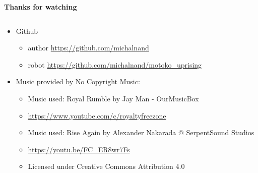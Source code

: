 \documentclass[xcolor=dvipsnames]{beamer}
\begin{document}
\begin{frame}{\bf Thanks for watching}
\begin{columns}
\begin{column}{0.7\textwidth}  %
{\small
    \begin{itemize}
        \item Github
            \begin{itemize}
                \item author \url{https://github.com/michalnand}
                \item robot \url{https://github.com/michalnand/motoko_uprising}
            \end{itemize}
        \item Music provided by No Copyright Music:
            \begin{itemize}
                \item Music used: Royal Rumble by Jay Man - OurMusicBox
                \item \url{https://www.youtube.com/c/royaltyfreezone}
                \item Music used: Rise Again by Alexander Nakarada @ SerpentSound Studios
                \item \url{https://youtu.be/FC_ER8wr7Fs}
                \item Licensed under Creative Commons Attribution 4.0
            \end{itemize}
        \end{itemize}
}
\end{column}

\end{columns}

\end{frame}
\end{document}
